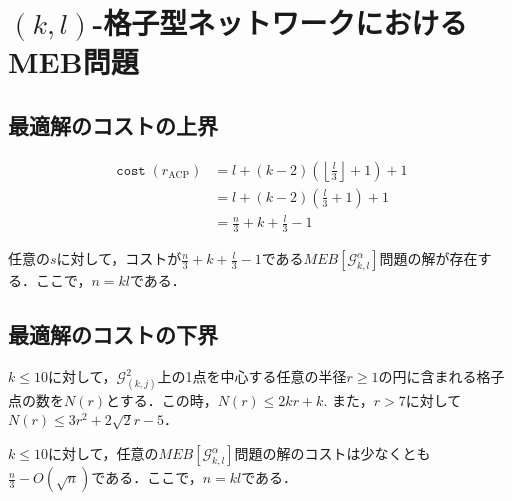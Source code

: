 \documentclass{classes/resume}
\begin{document}
\section{$(k,l)$-格子型ネットワークにおけるMEB問題}
\subsection{最適解のコストの上界}

\begin{align*}
    \operatorname{\mathtt{cost}}(r_{\mathrm{ACP}})
    &= l + \left(k -2\right) \left(\left\lfloor \frac{l}{3} \right\rfloor + 1\right) + 1
    \\[0.5ex]
    &= l + \left(k -2\right) \left(\frac{l}{3} + 1\right) + 1
    \\[0.5ex]
    &= \frac{n}{3} + k + \frac{l}{3} - 1
\end{align*}

\begin{theorem}
    任意の$s$に対して，コストが$\frac{n}{3} + k + \frac{l}{3} - 1$である$\mathit{MEB[\mathcal{G}_{k,l}^{\alpha}]}$問題の解が存在する．ここで，$n = kl$である．
\end{theorem}

\subsection{最適解のコストの下界}
\begin{lemma}
    $k \leq 10$に対して，$\mathcal{G}_{(k,j)}^2$上の1点を中心する任意の半径$r \geq 1$の円に含まれる格子点の数を$N(r)$とする．この時，$N(r) \leq 2kr + k$. また，$r > 7$に対して$N(r) \leq 3r^2 + 2\sqrt{2}r - 5$．
\end{lemma}

\begin{theorem}
    $k \leq 10$に対して，任意の$\mathit{MEB[\mathcal{G}_{k,l}^{\alpha}]}$問題の解のコストは少なくとも$\frac{n}{3} - O(\sqrt{n})$である．ここで，$n = kl$である．
\end{theorem}

{}
\printbibliography[title=参考文献]
\end{document}
